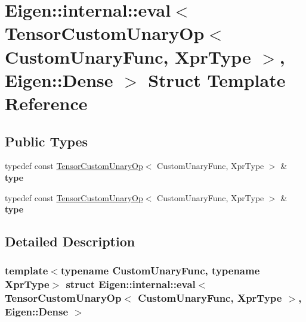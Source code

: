 \hypertarget{struct_eigen_1_1internal_1_1eval_3_01_tensor_custom_unary_op_3_01_custom_unary_func_00_01_xpr_ty453212bf40fc24f334a0deb6823dd342}{}\section{Eigen\+:\+:internal\+:\+:eval$<$ Tensor\+Custom\+Unary\+Op$<$ Custom\+Unary\+Func, Xpr\+Type $>$, Eigen\+:\+:Dense $>$ Struct Template Reference}
\label{struct_eigen_1_1internal_1_1eval_3_01_tensor_custom_unary_op_3_01_custom_unary_func_00_01_xpr_ty453212bf40fc24f334a0deb6823dd342}
\subsection*{Public Types}
\begin{DoxyCompactItemize}
\item 
\mbox{\label{struct_eigen_1_1internal_1_1eval_3_01_tensor_custom_unary_op_3_01_custom_unary_func_00_01_xpr_ty453212bf40fc24f334a0deb6823dd342_abde9fcc0652d45dad472bfce5d9d7f8d}} 
typedef const \hyperlink{class_eigen_1_1_tensor_custom_unary_op}{Tensor\+Custom\+Unary\+Op}$<$ Custom\+Unary\+Func, Xpr\+Type $>$ \& {\bfseries type}
\item 
\mbox{\label{struct_eigen_1_1internal_1_1eval_3_01_tensor_custom_unary_op_3_01_custom_unary_func_00_01_xpr_ty453212bf40fc24f334a0deb6823dd342_abde9fcc0652d45dad472bfce5d9d7f8d}} 
typedef const \hyperlink{class_eigen_1_1_tensor_custom_unary_op}{Tensor\+Custom\+Unary\+Op}$<$ Custom\+Unary\+Func, Xpr\+Type $>$ \& {\bfseries type}
\end{DoxyCompactItemize}


\subsection{Detailed Description}
\subsubsection*{template$<$typename Custom\+Unary\+Func, typename Xpr\+Type$>$\newline
struct Eigen\+::internal\+::eval$<$ Tensor\+Custom\+Unary\+Op$<$ Custom\+Unary\+Func, Xpr\+Type $>$, Eigen\+::\+Dense $>$}



